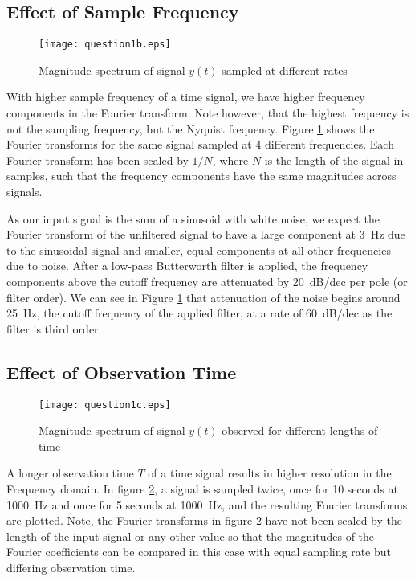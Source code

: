 \documentclass[11pt,a4paper]{article}
\begin{document}
\subsection{Effect of Sample Frequency}
\begin{figure}
    \begin{center}
        \texttt{[image: question1b.eps]}
    \end{center}
    \caption{Magnitude spectrum of signal $y(t)$ sampled at different rates}
    \label{fig:1b}
\end{figure}
With higher sample frequency of a time signal, we have higher frequency
components in the Fourier transform. Note however, that the highest frequency
is not the sampling frequency, but the Nyquist frequency. Figure \ref{fig:1b}
shows the Fourier transforms for the same signal sampled at 4 different
frequencies. Each Fourier transform has been scaled by $1/N$, where $N$ is the
length of the signal in samples, such that the frequency components have the
same magnitudes across signals.

As our input signal is the sum of a sinusoid with white noise, we expect the
Fourier transform of the unfiltered signal to have a large component at \mbox{3
Hz} due to the sinusoidal signal and smaller, equal components at all other
frequencies due to noise. After a low-pass Butterworth filter is applied, the
frequency components above the cutoff frequency are attenuated by \mbox{20
dB/dec} per pole (or filter order). We can see in Figure \ref{fig:1b} that
attenuation of the noise begins around \mbox{25 Hz}, the cutoff frequency of
the applied filter, at a rate of \mbox{60 dB/dec} as the filter is third order.

\subsection{Effect of Observation Time}
\begin{figure}
    \begin{center}
        \texttt{[image: question1c.eps]}
    \end{center}
    \caption{Magnitude spectrum of signal $y(t)$ observed for different lengths
    of time}
    \label{fig:1c}
\end{figure}
A longer observation time $T$ of a time signal results in higher resolution in
the Frequency domain. In figure \ref{fig:1c}, a signal is sampled twice, once
for 10 seconds at \mbox{1000 Hz} and once for 5 seconds at \mbox{1000 Hz}, and
the resulting Fourier transforms are plotted. Note, the Fourier transforms in
figure \ref{fig:1c} have not been scaled by the length of the input signal or
any other value so that the magnitudes of the Fourier coefficients can be
compared in this case with equal sampling rate but differing observation time.
\end{document}

